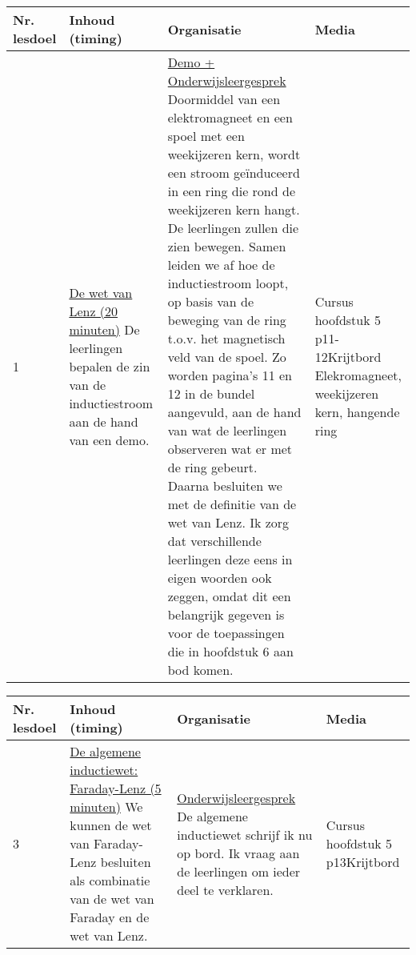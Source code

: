 \begin{landscape}
\newpage
	
	\begin{tabularx}{1.56\textwidth}{|p{1.5cm}|p{8cm}|X|p{4cm}|}
		\hline
		\textbf{Nr. lesdoel } & \textbf{Inhoud (timing)}  & \textbf{Organisatie } & \textbf{Media } \\ \hline
		1\newline\newline 2&\underline{De wet van Lenz (20 minuten)}\newline
			De leerlingen bepalen de zin van de inductiestroom  aan de hand van een demo.
		&  \underline{Demo + Onderwijsleergesprek}\newline 
			Doormiddel van een elektromagneet en een spoel met een weekijzeren kern, wordt een stroom geïnduceerd in een ring die rond de weekijzeren kern hangt. De leerlingen zullen die zien bewegen. Samen leiden we af hoe de inductiestroom loopt, op basis van de beweging van de ring t.o.v. het magnetisch veld van de spoel. Zo worden pagina's 11 en 12 in de bundel aangevuld, aan de hand van wat de leerlingen observeren wat er met de ring gebeurt. Daarna besluiten we met de definitie van de wet van Lenz. Ik zorg dat verschillende leerlingen deze eens in eigen woorden ook zeggen, omdat dit een belangrijk gegeven is voor de toepassingen die in hoofdstuk 6 aan bod komen. 
		&   Cursus hoofdstuk 5 p11-12\newline\newline Krijtbord \newline\newline Elekromagneet, weekijzeren kern, hangende ring
		\\ \hline
	\end{tabularx}\vspace{5mm}

	
\begin{tabularx}{1.56\textwidth}{|p{1.5cm}|p{8cm}|X|p{4cm}|}
	\hline
	\textbf{Nr. lesdoel } & \textbf{Inhoud (timing)}  & \textbf{Organisatie } & \textbf{Media } \\ \hline
	3\newline\newline 4\newline\newline &\underline{De algemene inductiewet:} \underline{Faraday-Lenz (5 minuten)}\newline
	We kunnen de wet van Faraday-Lenz besluiten als combinatie van de wet van Faraday en de wet van Lenz.
	&  \underline{Onderwijsleergesprek}\newline 
	De algemene inductiewet schrijf ik nu op bord. Ik vraag aan de leerlingen om ieder deel te verklaren.
	&   Cursus hoofdstuk 5 p13\newline\newline Krijtbord 
	\\ \hline
\end{tabularx}\vspace{5mm}



\end{landscape}

